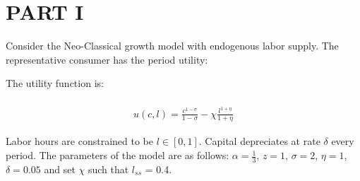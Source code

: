 \documentclass[a4paper]{article}
\begin{document}



\section{PART I}

Consider the Neo-Classical growth model with endogenous labor supply. The representative consumer has the period utility:

The utility function is:\\~\
\begin{align*}
u(c,l) = \frac{c^{1-\sigma}}{1-\sigma} - \chi \frac{l^{1+\eta}}{1+\eta}
\end{align*}

Labor hours are constrained to be $l \in [0,1]$. Capital depreciates at rate $\delta$ every period. The parameters of the model are as follows: $\alpha=\frac{1}{3}$, $z=1$, $ \sigma	=2$, $\eta =1$, $\delta = 0.05$ and set $\chi$ such that $l_{ss}$ = 0.4.\\~\
\end{document}
